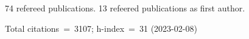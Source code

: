 74 refereed publications. 13 refeered publications as first author.

Total citations~=~3107; h-index~=~31 (2023-02-08)